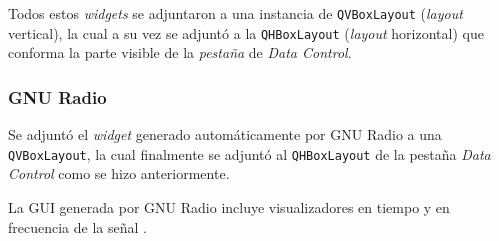 \documentclass[../../main.tex]{subfiles}
\begin{document}
Todos estos \textit{widgets} se adjuntaron a una instancia de \texttt{QVBoxLayout} (\textit{layout} vertical), la cual a su vez se adjuntó a la \texttt{QHBoxLayout} (\textit{layout} horizontal) que conforma la parte visible de la \textit{pestaña} de \textit{Data Control}.

\subsubsection{GNU Radio}
Se adjuntó el \textit{widget} generado automáticamente por GNU Radio a una \texttt{QVBoxLayout}, la cual finalmente se adjuntó al \texttt{QHBoxLayout} de la pestaña \textit{Data Control} como se hizo anteriormente.

La GUI generada por GNU Radio incluye visualizadores en tiempo y en frecuencia de la señal .

\end{document}
